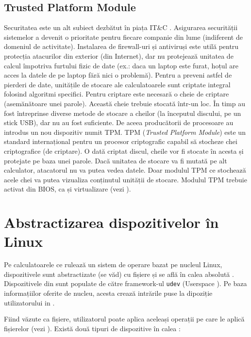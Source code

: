 \subsection{Trusted Platform Module}
\label{sec:hardware-functionalitati-tpm}

Securitatea este un alt subiect dezbătut în piața IT\&C
. Asigurarea
securității sistemelor a devenit o prioritate pentru fiecare companie din lume
(indiferent de domeniul de activitate). Instalarea de firewall-uri și antiviruși
este utilă pentru protecția atacurilor din exterior (din Internet), dar nu
protejează unitatea de calcul împotriva furtului fizic de date (ex.: daca un
laptop este furat, hoțul are acces la datele de pe laptop fără nici o problemă).
Pentru a preveni astfel de pierderi de date, unitățile de stocare ale
calculatoarele sunt criptate integral folosind algoritmi specifici. Pentru
criptare este necesară o cheie de criptare (asemănătoare unei parole). Această
cheie trebuie stocată într-un loc. În timp au fost întreprinse diverse metode de
stocare a cheilor (la începutul discului, pe un stick USB), dar nu au fost
suficiente. De aceea producătorii de procesoare au introdus un nou dispozitiv
numit TPM. TPM (\textit{Trusted Platform Module}) este un standard internațional
pentru un procesor criptografic capabil să stocheze chei criptografice (de
criptare). O dată criptat discul, cheile vor fi stocate în acesta și protejate
pe baza unei parole. Dacă unitatea de stocare va fi mutată pe alt calculator,
atacatorul nu va putea vedea datele. Doar modulul TPM ce stochează acele chei va
putea vizualiza conținutul unității de stocare. Modulul TPM trebuie activat din
BIOS, ca și virtualizare (vezi ).

\section{Abstractizarea dispozitivelor în Linux}
\label{sec:hardware-abstract-linux}

Pe calculatoarele ce rulează un sistem de operare bazat pe nucleul Linux,
dispozitivele sunt abstractizate (se văd) cu fișiere și se află în calea
absolută . Dispozitivele din  sunt populate de către
framework-ul \texttt{udev} (Userspace ). Pe baza informațiilor
oferite de nucleu, acesta crează intrările puse la dipoziție utilizatorului in
.

Fiind văzute ca fișiere, utilizatorul poate aplica aceleași operații pe care le
aplică fișierelor (vezi ). Există
două tipuri de dispozitive în calea :

